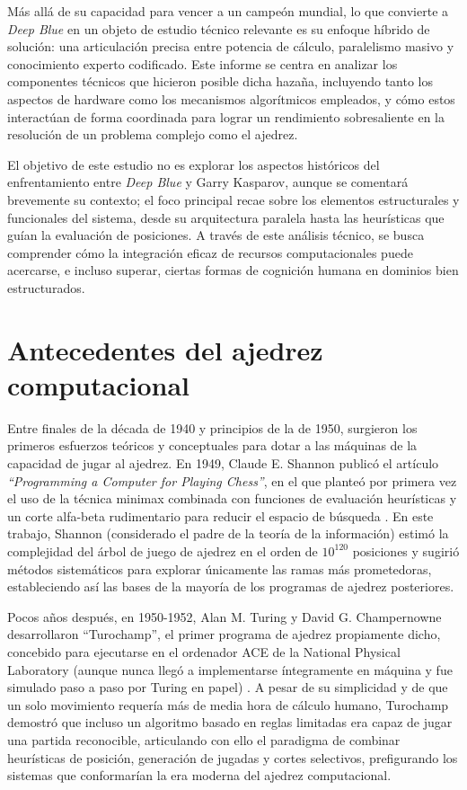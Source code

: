 \documentclass[a4paper, 12pt]{article}
\begin{document}
Más allá de su capacidad para vencer a un campeón mundial, lo 
que convierte a \textit{Deep Blue} en un objeto de estudio 
técnico relevante es su enfoque híbrido de solución: una 
articulación precisa entre potencia de cálculo, paralelismo 
masivo y conocimiento experto codificado. Este informe se centra 
en analizar los componentes técnicos que hicieron posible dicha 
hazaña, incluyendo tanto los aspectos de hardware como los 
mecanismos algorítmicos empleados, y cómo estos interactúan de 
forma coordinada para lograr un rendimiento sobresaliente en la 
resolución de un problema complejo como el ajedrez.

El objetivo de este estudio no es explorar los aspectos 
históricos del enfrentamiento entre \textit{Deep Blue} y Garry 
Kasparov, aunque se comentará brevemente su contexto; el foco 
principal recae sobre los elementos estructurales y funcionales 
del sistema, desde su arquitectura paralela hasta las 
heurísticas que guían la evaluación de posiciones. A través de 
este análisis técnico, se busca comprender cómo la integración 
eficaz de recursos computacionales puede acercarse, e incluso 
superar, ciertas formas de cognición humana en dominios bien 
estructurados.


\newpage


\section{Antecedentes del ajedrez computacional}


Entre finales de la década de 1940 y principios de la de 1950, 
surgieron los primeros esfuerzos teóricos y conceptuales para 
dotar a las máquinas de la capacidad de jugar al ajedrez. En 
1949, Claude E. Shannon publicó el artículo \emph{“Programming a 
Computer for Playing Chess”}, en el que planteó por primera vez 
el uso de la técnica minimax combinada con funciones de 
evaluación heurísticas y un corte alfa-beta rudimentario para 
reducir el espacio de búsqueda \cite{shannon1950xxii}. En este 
trabajo, Shannon (considerado el padre de la teoría de la 
información) estimó la complejidad del árbol de juego de ajedrez 
en el orden de \(10^{120}\) posiciones y sugirió métodos 
sistemáticos para explorar únicamente las ramas más prometedoras, 
estableciendo así las bases de la mayoría de los programas de 
ajedrez posteriores.

Pocos años después, en 1950-1952, Alan M. Turing y David G. 
Champernowne desarrollaron “Turochamp”, el primer programa de 
ajedrez propiamente dicho, concebido para ejecutarse en el 
ordenador ACE de la National Physical Laboratory (aunque nunca 
llegó a implementarse íntegramente en máquina y fue simulado 
paso a paso por Turing en papel) \cite{turing1953digital}. A pesar de 
su simplicidad y de que un solo movimiento requería más de media 
hora de cálculo humano, Turochamp demostró que incluso un 
algoritmo basado en reglas limitadas era capaz de jugar una 
partida reconocible, articulando con ello el paradigma de 
combinar heurísticas de posición, generación de jugadas y 
cortes selectivos, prefigurando los sistemas que conformarían la 
era moderna del ajedrez computacional.
\end{document}
